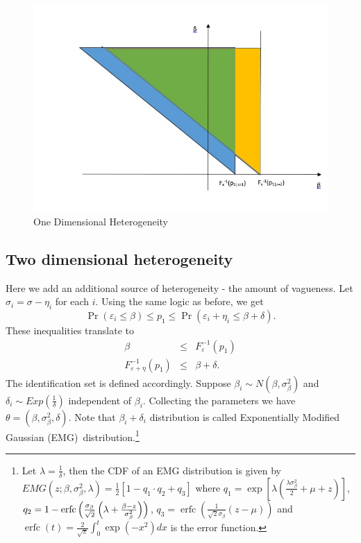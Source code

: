 \documentclass[reqno]{article}
\begin{document}
\begin{figure}[h!]
    \centering
    \includegraphics[scale=0.6]{oneDimHetero.jpg}
    \caption{One Dimensional Heterogeneity}
    \label{fig:oneDimHetero}
\end{figure}

\subsection{Two dimensional heterogeneity}

Here we add an additional source of heterogeneity - the amount of vagueness.
Let $\sigma _{i}=\sigma -\eta _{i}$ for each $i$. Using the same logic as
before, we get%
\begin{equation*}
\Pr (\varepsilon _{i}\leq \beta )\leq p_{1}\leq \Pr \left( \varepsilon
_{i}+\eta _{i}\leq \beta +\delta \right) .
\end{equation*}%
These inequalities translate to 
\begin{eqnarray*}
\beta &\leq &F_{\varepsilon }^{-1}\left( p_{1}\right) \\
F_{\varepsilon +\eta }^{-1}\left( p_{1}\right) &\leq &\beta +\delta .
\end{eqnarray*}%
The identification set is defined accordingly. Suppose $\beta_{i}\sim
N(\beta ,\sigma_{\beta }^{2})$ and $\delta_{i}\sim Exp\left( \frac{1}{\delta }\right)$ independent of $\beta_{i}$. Collecting the parameters we have $\theta =\left( \beta ,\sigma _{\beta }^{2},\delta \right)$. Note that $\beta_{i}+\delta_{i}$ distribution is called Exponentially Modified Gaussian (EMG)\ distribution.\footnote{%
Let $\lambda =\frac{1}{\delta }$, then the CDF of an EMG distribution is
given by $EMG(z;\beta ,\sigma _{\beta }^{2},\lambda )=\frac{1}{2}\left[
1-q_{1}\cdot q_{2}+q_{3}\right] $ where $q_{1}=\exp \left[ \lambda \left( 
\frac{\lambda \sigma _{\beta }^{2}}{2}+\mu +z\right) \right] $, $q_{2}=1-\operatorname{erfc}\left( \frac{\sigma _{\beta }}{\sqrt{2}}\left( \lambda +\frac{%
\beta -z}{\sigma _{\beta }^{2}}\right) \right) $, $q_{3}=\operatorname{erfc}\left( 
\frac{1}{\sqrt{2}\sigma _{\beta }}\left( z-\mu \right) \right) $ and $\operatorname{erfc}\left( t\right) =\frac{2}{\sqrt{\pi }}\int_{0}^{t}\exp \left(
-x^{2}\right) dx$ is the error function.}
\maketitle

\break

\end{document}

